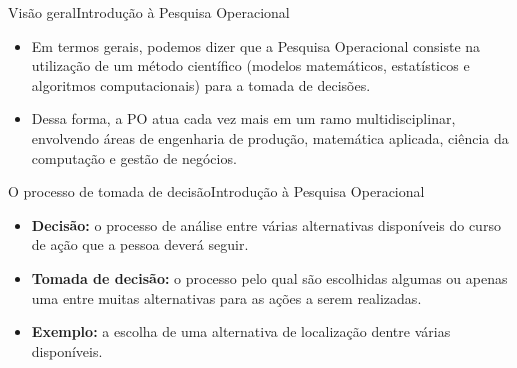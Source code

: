 \documentclass[t]{beamer}
\begin{document}

\begin{ftst}{Visão geral}{Introdução à Pesquisa Operacional}
\begin{itemize}
    \item Em termos gerais, podemos dizer que a Pesquisa Operacional consiste na utilização de um método científico (modelos matemáticos, estatísticos e algoritmos computacionais) para a tomada de decisões.
    \vone
    \item Dessa forma, a PO atua cada vez mais em um ramo multidisciplinar, envolvendo áreas de engenharia de produção, matemática aplicada, ciência da computação e gestão de negócios.
\end{itemize}
\end{ftst}


\begin{ftst}{O processo de tomada de decisão}{Introdução à Pesquisa Operacional}
\begin{itemize}
    \item \textbf{Decisão:} o processo de análise entre várias alternativas disponíveis do curso de ação que a pessoa deverá seguir.
    \item \textbf{Tomada de decisão:} o processo pelo qual são escolhidas algumas ou apenas uma entre muitas alternativas para as ações a serem realizadas.
    \item \textbf{Exemplo:} a escolha de uma alternativa de localização dentre várias disponíveis.
\end{itemize}

\end{ftst}

\end{document}

